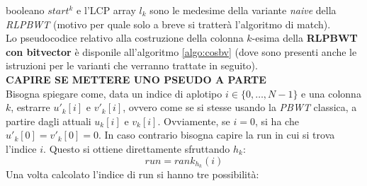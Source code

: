 booleano $start^k$ e l'LCP array $l_k$ sono le medesime della variante
\textit{naive} della \textit{RLPBWT} (motivo per quale solo a breve si
tratterà l'algoritmo di match).\\
Lo pseudocodice relativo alla costruzione della colonna $k$-esima della
\textbf{RLPBWT con bitvector} è disponile all'algoritmo \ref{algo:cosbv} (dove
sono presenti anche le istruzioni per le varianti che verranno trattate in
seguito).\\
\textbf{CAPIRE SE METTERE UNO PSEUDO A PARTE}\\
Bisogna spiegare come, data un indice di aplotipo $i\in\{0,\ldots,N-1\}$ e una
colonna $k$, estrarre $u'_k[i]$ e $v'_k[i]$, ovvero come se si stesse usando la
\textit{PBWT} classica, a partire dagli attuali $u_k[i]$ e $v_k[i]$. Ovviamente,
se $i=0$, si ha che $u'_k[0]=v'_k[0]=0$. In caso contrario bisogna capire la run
in cui si trova l'indice $i$. Questo si ottiene direttamente sfruttando $h_k$:
\[run = rank_{h_k}(i)\]
Una volta calcolato l'indice di run si hanno tre possibilità:
